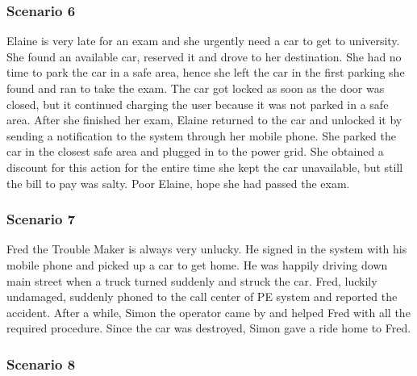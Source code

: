 \subsubsection{Scenario 6}
Elaine is very late for an exam and she urgently need a car to get to university. She found an available car, reserved it and drove to her destination. She had no time to park the car in a safe area, hence she left the car in the first parking she found and ran to take the exam. The car got locked as soon as the door was closed, but it continued charging the user because it was not parked in a safe area. After she finished her exam, Elaine returned to the car and unlocked it by sending a notification to the system through her mobile phone. She parked the car in the closest safe area and plugged in to the power grid. She obtained a discount for this action for the entire time she kept the car unavailable, but still the bill to pay was salty. Poor Elaine, hope she had passed the exam.

\subsubsection{Scenario 7}
Fred the Trouble Maker is always very unlucky. He signed in the system with his mobile phone and picked up a car to get home. He was happily driving down main street when a truck turned suddenly and struck the car. Fred, luckily undamaged, suddenly phoned to the call center of PE system and reported the accident. After a while, Simon the operator came by and helped Fred with all the required procedure. Since the car was destroyed, Simon gave a ride home to Fred.

\subsubsection{Scenario 8}




